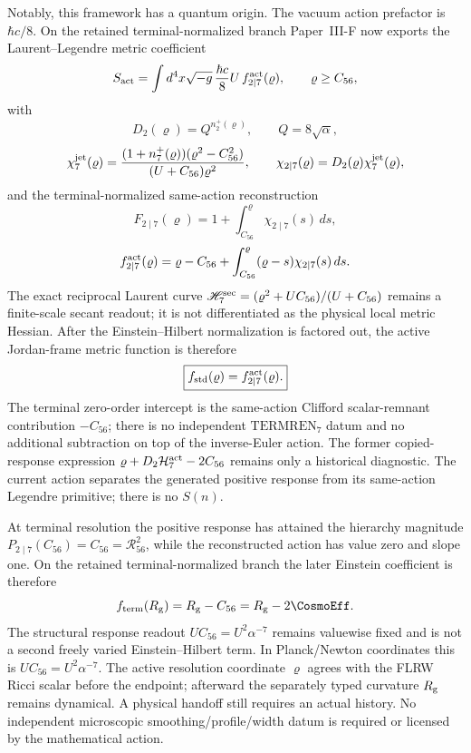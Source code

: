 \documentclass[12pt,a4paper]{article}
\begin{document}
Notably, this framework has a quantum origin.  The vacuum action prefactor is
\(\hbar c/8\).  On the retained terminal-normalized branch Paper~III-F now
exports the Laurent--Legendre metric coefficient
\begin{equation}
\label{p8:eq:Lagrangian}
 S_{\rm act}=\int d^4x\sqrt{-g}\,\frac{\hbar c}{8}U\,
 f_{2\mid7}^{\rm act}(\varrho),
 \qquad \varrho\ge C_{56},
\end{equation}
with
\[
 D_2(\varrho)=Q^{n_2^+(\varrho)},\qquad Q=8\sqrt\alpha,
\]
\[
 \chi_7^{\rm jet}(\varrho)
 =\frac{(1+n_7^+(\varrho))(\varrho^2-C_{56}^2)}
 {(U+C_{56})\varrho^2},\qquad
 \chi_{2\mid7}(\varrho)=D_2(\varrho)\chi_7^{\rm jet}(\varrho),
\]
and the terminal-normalized same-action reconstruction
\[
 F_{2\mid7}(\varrho)=1+\int_{C_{56}}^{\varrho}\chi_{2\mid7}(s)\,ds,
\]
\[
 f_{2\mid7}^{\rm act}(\varrho)
 =\varrho-C_{56}
  +\int_{C_{56}}^{\varrho}(\varrho-s)\chi_{2\mid7}(s)\,ds.
\]
The exact reciprocal Laurent curve
$\mathscr H_7^{\rm sec}=(\varrho^2+UC_{56})/(U+C_{56})$ remains a finite-scale
secant readout; it is not differentiated as the physical local metric Hessian.
After the Einstein--Hilbert normalization is factored out, the active
Jordan-frame metric function is therefore
\begin{equation}
\label{p8:eq:fstd-normalized}
 \boxed{f_{\rm std}(\varrho)=f_{2\mid7}^{\rm act}(\varrho).}
\end{equation}
The terminal zero-order intercept is the same-action Clifford
scalar-remnant contribution \(-C_{56}\); there is no independent
\(\mathrm{TERMREN}_7\) datum and no additional subtraction on top of the
inverse-Euler action.
The former copied-response expression
\(\varrho+D_2\mathcal H_7^{\rm act}-2C_{56}\) remains only a historical
diagnostic.  The current action separates the generated positive response
from its same-action Legendre primitive; there is no \(S(n)\).

At terminal resolution the positive response has attained the hierarchy magnitude
\(P_{2\mid7}(C_{56})=C_{56}=\mathcal R_{56}^2\), while the reconstructed
action has value zero and slope one.  On the retained terminal-normalized branch the later Einstein coefficient is therefore
\begin{equation}
 f_{\rm term}(R_{\rm g})=R_{\rm g}-C_{56}
 =R_{\rm g}-2\CosmoEff.
\end{equation}
The structural response readout \(U C_{56}=U^2\alpha^{-7}\) remains valuewise
fixed and is not a second freely varied Einstein--Hilbert term.  In Planck/Newton coordinates this is
\(U C_{56}=U^2\alpha^{-7}\).  The active
resolution coordinate \(\varrho\) agrees with the FLRW Ricci scalar before
the endpoint; afterward the separately typed curvature \(R_{\rm g}\) remains
dynamical.  A physical handoff still requires an actual history.  No independent
microscopic smoothing/profile/width datum is required or licensed by the
mathematical action.
\end{document}
